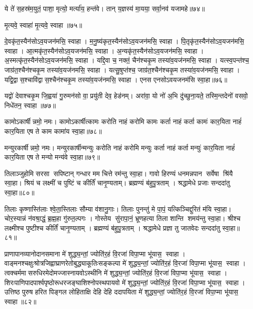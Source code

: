 ये ते॑ स॒हस्र॑म॒युतं॒ पाशा॒ मृत्यो॒ मर्त्या॑य॒ हन्त॑वे। तान् य॒ज्ञस्य॑ मा॒यया॒ सर्वा॒नव॑ यजामहे॥७४॥\anuvakamend
 
मृ॒त्यवे॒ स्वाहा॑ मृ॒त्यवे॒ स्वाहा॥७५॥%
\anuvakamend 

दे॒वकृ॑त॒स्यैन॑सोऽव॒यजन॑मसि॒ स्वाहा। म॒नु॒ष्य॑कृत॒स्यैन॑सो\-ऽव॒यजन॑मसि॒ स्वाहा। 
पि॒तृकृ॑त॒स्यैन॑सो\-ऽव॒यजन॑मसि॒ स्वाहा। आ॒त्मकृ॑त॒स्यैन॑सो\-ऽव॒यजन॑मसि॒ स्वाहा। 
अ॒न्यकृ॑त॒स्यैन॑सो\-ऽव॒यजन॑मसि॒ स्वाहा। अ॒स्मत्कृ॑त॒स्यैन॑सो\-ऽव॒यजन॑मसि॒ स्वाहा। 
यद्दि॒वा च॒ नक्तं॒ चैन॑श्चकृ॒म तस्या॑व॒यज॑नमसि॒ स्वाहा। यत्स्व॒पन्त॑श्च॒ जाग्र॑त॒श्चैन॑श्चकृ॒म तस्या॑व॒यज॑नमसि॒ स्वाहा। 
यत्सु॒षुप्त॑श्च॒ जाग्र॑त॒श्चैन॑श्चकृ॒म तस्या॑व॒यज॑नमसि॒ स्वाहा। यद्वि॒द्वास॒श्चावि॑द्वास॒श्चैन॑श्चकृ॒म तस्या॑व॒यज॑नमसि॒ स्वाहा। एनस एनसोऽवयजनम॑सि स्वा॒हा॥७६॥\anuvakamend

यद्वो॑ देवाश्चकृ॒म जि॒ह्वया॑ गु॒रुमन॑सो वा॒ प्रयु॑ती देव॒ हेड॑नम्। अरा॑वा॒ यो नो॑ अ॒भि दु॑च्छुना॒यते॒ तस्मि॒न्तदेनो॑ वसवो॒ निधे॑तन॒ स्वाहा॥७७॥ \anuvakamend



कामोऽकार्\mbox{}षीन्नमो॒ नमः।  कामोऽकार्\mbox{}षीत्कामः करोति नाहं करोमि कामः कर्ता नाहं कर्ता कामः॑ कार॒यिता नाहं॑ कार॒यिता एष ते काम कामा॑य स्वा॒हा॥७८॥
\anuvakamend

मन्युरकार्\mbox{}षीन्नमो॒ नमः। मन्युरकार्\mbox{}षीन्मन्युः करोति नाहं करोमि मन्युः कर्ता नाहं कर्ता मन्युः॑ कार॒यिता नाहं॑ कार॒यिता एष ते मन्यो मन्य॑वे स्वा॒हा॥७९॥
\anuvakamend

तिलाञ्जुहोमि सरसा सपिष्टान् गन्धार मम चित्ते रम॑न्तु स्वा॒हा। गावो हिरण्यं धनमन्नपान सर्वेषा श्रि॑यै स्वा॒हा। श्रियं च लक्ष्मीं च पुष्टिं च कीर्तिं॑ चानृ॒ण्यताम्। ब्रह्मण्यं ब॑हुपु॒त्रताम् । श्रद्धामेधे प्रजाः सन्ददा॑तु स्वा॒हा॥८०॥
\anuvakamend

तिलाः कृष्णास्ति॑लाः श्वे॒ता॒स्तिलाः सौम्या व॑शानु॒गाः। तिलाः पुनन्तु॑ मे पा॒पं॒ यत्किञ्चिद्दुरितं म॑यि स्वा॒हा। चोर॒स्यान्नं न॑वश्रा॒द्धं॒ ब्र॒ह्म॒हा गु॑रुत॒ल्पगः । गोस्तेय सु॑रापा॒नं॒ भ्रूणहत्या तिला शान्ति शमय॑न्तु स्वा॒हा। श्रीश्च लक्ष्मीश्च पुष्टीश्च कीर्तिं॑ चानृ॒ण्यताम् । ब्रह्मण्यं ब॑हुपु॒त्रताम् । श्रद्धामेधे प्रज्ञा तु जातवेदः सन्ददा॑तु स्वा॒हा॥८१॥
 \anuvakamend

प्राणापानव्यानोदानसमाना मे॑ शुद्ध्य॒न्तां॒ ज्योति॑र॒हं वि॒रजा॑ विपा॒प्मा भू॑यास॒ स्वाहा।
वाङ्मनश्चक्षुःश्रोत्रजिह्वाघ्राणरेतो\-बुद्ध्याकूतिः\-सङ्कल्पा मे॑ शुद्ध्य॒न्तां॒ ज्योति॑र॒हं वि॒रजा॑ विपा॒प्मा भू॑यास॒ स्वाहा। त्वक्चर्ममासरुधिरमेदोमज्जास्नायवोऽस्थीनि  मे॑ शुद्ध्य॒न्तां॒ ज्योति॑र॒हं वि॒रजा॑ विपा॒प्मा भू॑यास॒ स्वाहा। शिरःपाणिपादपार्श्वपृष्ठोरूधरजङ्घाशिश्नोपस्थपायवो  मे॑ शुद्ध्य॒न्तां॒ ज्योति॑र॒हं वि॒रजा॑ विपा॒प्मा भू॑यास॒ स्वाहा।
उत्तिष्ठ पुरुष हरित पिङ्गल लोहिताक्षि देहि देहि ददापयिता मे॑ शुद्ध्य॒न्तां॒ ज्योति॑र॒हं वि॒रजा॑ विपा॒प्मा भू॑यास॒ स्वाहा॥८२॥ \anuvakamend

